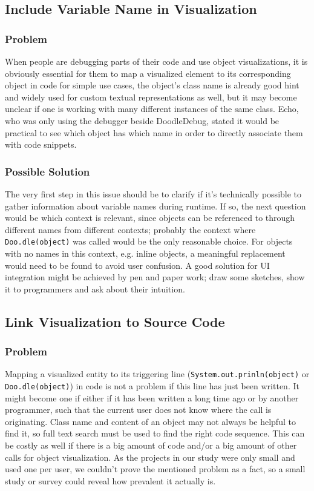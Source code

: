 \documentclass[english]{acm_proc_article-sp}
\begin{document}
\subsection{Include Variable Name in Visualization}

\subsubsection{Problem} When people are debugging parts of their code and use object visualizations, it is obviously essential for them to map a visualized element to its corresponding object in code for simple use cases, the object's class name is already good hint and widely used for custom textual representations as well\cite{dd-study}, but it may become unclear if one is working with many different instances of the same class. Echo, who was only using the debugger beside DoodleDebug, stated it would be practical to see which object has which name in order to directly associate them with code snippets.

\subsubsection{Possible Solution}
The very first step in this issue should be to clarify if it's technically possible to gather information about variable names during runtime. If so, the next question would be which context is relevant, since objects can be referenced to through different names from different contexts; probably the context where \verb-Doo.dle(object)- was called would be the only reasonable choice. For objects with no names in this context, e.g. inline objects, a meaningful replacement would need to be found to avoid user confusion. A good solution for UI integration might be achieved by pen and paper work; draw some sketches, show it to programmers and ask about their intuition.

\subsection{Link Visualization to Source Code}
\subsubsection{Problem}
Mapping a visualized entity to its triggering line (\verb-System.out.prinln(object)- or \verb-Doo.dle(object)-) in code is not a problem if this line has just been written. It might become one if either if it has been written a long time ago or by another programmer, such that the current user does not know where the call is originating. Class name and content of an object may not always be helpful to find it, so full text search must be used to find the right code sequence. This can be costly as well if there is a big amount of code and/or a big amount of other calls for object visualization. As the projects in our study were only small and used one per user, we couldn't prove the mentioned problem as a fact, so a small study or survey could reveal how prevalent it actually is.
\end{document}
